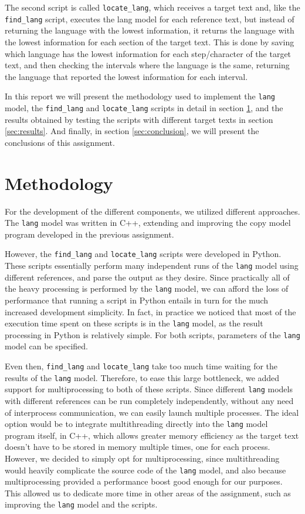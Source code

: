 \documentclass{article}
\begin{document}
The second script is called \texttt{locate\_lang}, which receives a target text and, like the \texttt{find\_lang} script, executes the lang model for each reference text, but instead of returning the language with the lowest information, it returns the language with the lowest information for each section of the target text.
This is done by saving which language has the lowest information for each step/character of the target text, and then checking the intervals where the language is the same, returning the language that reported the lowest information for each interval.

In this report we will present the methodology used to implement the \texttt{lang} model, the \texttt{find\_lang} and \texttt{locate\_lang} scripts in detail in section \ref{sec:methodology}, and the results obtained by testing the scripts with different target texts in section \ref{sec:results}.
And finally, in section \ref{sec:conclusion}, we will present the conclusions of this assignment.

\section{Methodology}
\label{sec:methodology}

For the development of the different components, we utilized different approaches.
The \texttt{lang} model was written in C++, extending and improving the copy model program developed in the previous assignment.

However, the \texttt{find\_lang} and \texttt{locate\_lang} scripts were developed in Python.
These scripts essentially perform many independent runs of the \texttt{lang} model using different references, and parse the output as they desire.
Since practically all of the heavy processing is performed by the \texttt{lang} model, we can afford the loss of performance that running a script in Python entails in turn for the much increased development simplicity.
In fact, in practice we noticed that most of the execution time spent on these scripts is in the \texttt{lang} model, as the result processing in Python is relatively simple.
For both scripts, parameters of the \texttt{lang} model can be specified.

Even then, \texttt{find\_lang} and \texttt{locate\_lang} take too much time waiting for the results of the \texttt{lang} model.
Therefore, to ease this large bottleneck, we added support for multiprocessing to both of these scripts.
Since different \texttt{lang} models with different references can be run completely independently, without any need of interprocess communication, we can easily launch multiple processes.
The ideal option would be to integrate multithreading directly into the \texttt{lang} model program itself, in C++, which allows greater memory efficiency as the target text doesn't have to be stored in memory multiple times, one for each process.
However, we decided to simply opt for multiprocessing, since multithreading would heavily complicate the source code of the \texttt{lang} model, and also because multiprocessing provided a performance boost good enough for our purposes.
This allowed us to dedicate more time in other areas of the assignment, such as improving the \texttt{lang} model and the scripts.
\end{document}
